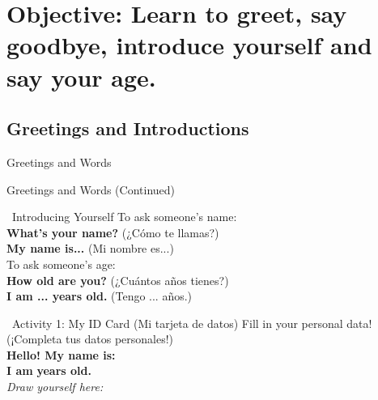 \section*{Objective: Learn to greet, say goodbye, introduce yourself and say your age.}

\subsection*{Greetings and Introductions}

\begin{vocabcard}{Greetings and Words}
\end{vocabcard}

\newpage

\begin{vocabcard}{Greetings and Words (Continued)}
\end{vocabcard}

\begin{grammartip}{ \ Introducing Yourself}
  To ask someone's name:\\
  \textbf{What's your name?} (¿Cómo te llamas?)\\
  \textbf{My name is...} (Mi nombre es...)\\[1em]
  To ask someone's age:\\
  \textbf{How old are you?} (¿Cuántos años tienes?)\\
  \textbf{I am ... years old.} (Tengo ... años.)
\end{grammartip}

\begin{activity}{ \ Activity 1: My ID Card (Mi tarjeta de datos)}
  Fill in your personal data! (¡Completa tus datos personales!)\\[1em]
  \textbf{Hello! My name is:} \answerline[5cm]\\[1em]
  \textbf{I am} \answerline[2cm] \textbf{years old.}\\[1em]
  \emph{Draw yourself here:}\\[1em]
  \vspace{3cm}
\end{activity}

